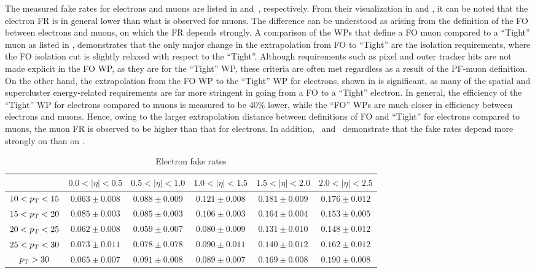 The measured fake rates for electrons and muons are listed in  and~, respectively. From their visualization in  and , it can be noted that the electron FR is in general lower than what is observed for muons. The difference can be understood as arising from the definition of the FO between electrons and muons, on which the FR depends strongly. A comparison of the WPs that define a FO muon compared to a ``Tight'' muon as listed in , demonstrates that the only major change in the extrapolation from FO to ``Tight'' are the isolation requirements, where the FO isolation cut is slightly relaxed with respect to the ``Tight''. Although requirements such as pixel and outer tracker hits are not made explicit in the FO WP, as they are for the ``Tight'' WP, these criteria are often met regardless as a result of the PF-muon definition. On the other hand, the extrapolation from the FO WP to the ``Tight'' WP for electrons, shown in  is significant, as many of the spatial and supercluster energy-related requirements are far more stringent in going from a FO to a ``Tight'' electron. In general, the efficiency of the ``Tight'' WP for electrons compared to muons is measured to be $40\%$ lower, while the ``FO'' WPs are much closer in efficiency between electrons and muons. Hence, owing to the larger extrapolation distance between definitions of FO and ``Tight'' for electrons compared to muons, the muon FR is observed to be higher than that for electrons. In addition,~ and~ demonstrate that the fake rates depend more strongly on \eta than on \pt.

\begin{table}[!ht]
\centering
\scalebox{0.9}
{
\begin{tabular}{|c|c|c|c|c|c|}
\hline
                & $0.0 < |\eta| < 0.5$ & $0.5 < |\eta| < 1.0$ & $1.0 < |\eta| < 1.5$ & $1.5 < |\eta| < 2
.0$ & $2.0 < |\eta| < 2.5$ \\
\hline
$10 < p_{\mathrm{T}} < 15$ &  $0.063 \pm  0.008$  & $ 0.088 \pm  0.009$  &  $0.121 \pm  0.008$  &  $0.181 \pm  0.00
9$  &  $0.176 \pm  0.012$ \\
\hline  
$15 < p_{\mathrm{T}} < 20$ &  $0.085 \pm  0.003$  & $ 0.085 \pm  0.003$  &  $0.106 \pm  0.003$  &  $0.164 \pm  0.00
4$  &  $0.153 \pm  0.005$ \\
\hline
$20 < p_{\mathrm{T}} < 25$ & $ 0.062 \pm  0.008$  &  $0.059 \pm  0.007$  &  $0.080 \pm  0.009$  &  $0.131 \pm  0.010$  &  $0.148 \pm  0.012$ \\
\hline 
$25 < p_{\mathrm{T}} < 30$ &  $0.073 \pm  0.011$  &  $0.078 \pm  0.078$  &  $0.090 \pm  0.011$  &  $0.140 \pm  0.012$  &  $0.162 \pm  0.012$ \\
\hline
$p_{\mathrm{T}} > 30$      &  $0.065 \pm  0.007$  &  $0.091 \pm  0.008$  &  $0.089 \pm  0.007$  &  $0.169 \pm  0.008$  &  $0.190 \pm  0.008$ \\
\hline    
\end{tabular}   
}
\caption{Electron fake rates}
\label{tab:ele_fr}
\end{table}

